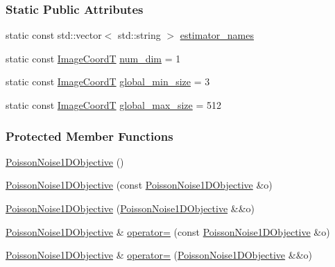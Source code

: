 \subsubsection*{Static Public Attributes}
\begin{DoxyCompactItemize}
\item 
static const std\+::vector$<$ std\+::string $>$ \hyperlink{classmappel_1_1PoissonNoise1DObjective_a985200133fb3e5bfdf8755296cf700eb}{estimator\+\_\+names}
\item 
static const \hyperlink{classmappel_1_1ImageFormat1DBase_a82ab3168eb1a87eaeb3e7c919188e9fc}{Image\+CoordT} \hyperlink{classmappel_1_1ImageFormat1DBase_af81159de9010c3618d2f69349c1f2368}{num\+\_\+dim} = 1
\item 
static const \hyperlink{classmappel_1_1ImageFormat1DBase_a82ab3168eb1a87eaeb3e7c919188e9fc}{Image\+CoordT} \hyperlink{classmappel_1_1ImageFormat1DBase_a27c75df8b3d83856d7c2c42ee987af89}{global\+\_\+min\+\_\+size} = 3
\item 
static const \hyperlink{classmappel_1_1ImageFormat1DBase_a82ab3168eb1a87eaeb3e7c919188e9fc}{Image\+CoordT} \hyperlink{classmappel_1_1ImageFormat1DBase_a5aafad20e635eae6f3609af56abad3ad}{global\+\_\+max\+\_\+size} = 512
\end{DoxyCompactItemize}
\subsubsection*{Protected Member Functions}
\begin{DoxyCompactItemize}
\item 
\hyperlink{classmappel_1_1PoissonNoise1DObjective_af5a4f7d5c6d8daf65a24fc13463483c8}{Poisson\+Noise1\+D\+Objective} ()
\item 
\hyperlink{classmappel_1_1PoissonNoise1DObjective_a728dad0989226cb45e6a184d6d04a430}{Poisson\+Noise1\+D\+Objective} (const \hyperlink{classmappel_1_1PoissonNoise1DObjective}{Poisson\+Noise1\+D\+Objective} \&o)
\item 
\hyperlink{classmappel_1_1PoissonNoise1DObjective_ade8f84dd53b28f14ffb49bda8329c92e}{Poisson\+Noise1\+D\+Objective} (\hyperlink{classmappel_1_1PoissonNoise1DObjective}{Poisson\+Noise1\+D\+Objective} \&\&o)
\item 
\hyperlink{classmappel_1_1PoissonNoise1DObjective}{Poisson\+Noise1\+D\+Objective} \& \hyperlink{classmappel_1_1PoissonNoise1DObjective_ab41b3958b61d38ef779fa2b52352e9ff}{operator=} (const \hyperlink{classmappel_1_1PoissonNoise1DObjective}{Poisson\+Noise1\+D\+Objective} \&o)
\item 
\hyperlink{classmappel_1_1PoissonNoise1DObjective}{Poisson\+Noise1\+D\+Objective} \& \hyperlink{classmappel_1_1PoissonNoise1DObjective_a7aa170f9e24de2fe0fd4d8c101c42d30}{operator=} (\hyperlink{classmappel_1_1PoissonNoise1DObjective}{Poisson\+Noise1\+D\+Objective} \&\&o)
\end{DoxyCompactItemize}
